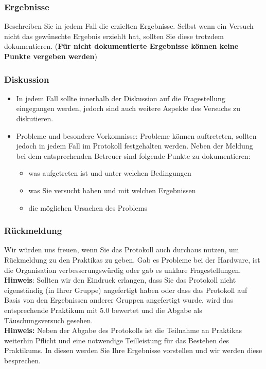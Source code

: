 \subsubsection{Ergebnisse}
Beschreiben Sie in jedem Fall die erzielten Ergebnisse. Selbst wenn ein Versuch nicht das gewünschte Ergebnis erziehlt hat, sollten Sie diese trotzdem dokumentieren. (\textbf{Für nicht dokumentierte Ergebnisse können keine Punkte vergeben werden})

\subsubsection{Diskussion}
\begin{itemize}
	\item In jedem Fall sollte innerhalb der Diskussion auf die Fragestellung eingegangen werden, jedoch sind auch weitere Aspekte des Versuchs zu diskutieren.
	\newpage
	\item Probleme und besondere Vorkomnisse: Probleme können auftreteten, sollten jedoch in jedem Fall im Protokoll festgehalten werden. Neben der Meldung bei dem entsprechenden Betreuer sind folgende Punkte zu dokumentieren:
	\begin{itemize}
		\item was aufgetreten ist und unter welchen Bedingungen
		\item was Sie versucht haben und mit welchen Ergebnissen
		\item die möglichen Ursachen des Problems
	\end{itemize}
\end{itemize}

\subsubsection{Rückmeldung}
Wir würden uns freuen, wenn Sie das Protokoll auch durchaus nutzen, um Rückmeldung zu den Praktikas zu geben. Gab es Probleme bei der Hardware, ist die Organisation verbesserungswürdig oder gab es unklare Fragestellungen. \\

\textbf{Hinweis}: Sollten wir den Eindruck erlangen, dass Sie das Protokoll nicht eigenständig (in Ihrer Gruppe) angefertigt haben oder dass das Protokoll auf Basis von den Ergebnissen anderer Gruppen angefertigt wurde, wird das entsprechende Praktikum mit 5.0 bewertet und die Abgabe als Täuschungsversuch gesehen.
\\

\textbf{Hinweis:} Neben der Abgabe des Protokolls ist die Teilnahme an Praktikas weiterhin Pflicht und eine notwendige Teilleistung für das Bestehen des Praktikums. In diesen werden Sie Ihre Ergebnisse vorstellen und wir werden diese besprechen.

